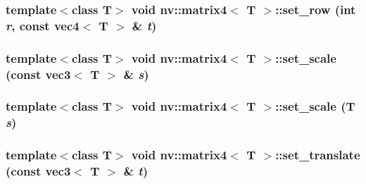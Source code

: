 \hypertarget{classnv_1_1matrix4_d79dcdcafcf5fab54a990621f87c2f20}{
\subsubsection[{set\_\-row}]{\setlength{\rightskip}{0pt plus 5cm}template$<$class T$>$ void {\bf nv::matrix4}$<$ T $>$::set\_\-row (int {\em r}, \/  const {\bf vec4}$<$ T $>$ \& {\em t})}}
\label{classnv_1_1matrix4_d79dcdcafcf5fab54a990621f87c2f20}


\hypertarget{classnv_1_1matrix4_7663538941eda617052f477ec9eb2f15}{
\subsubsection[{set\_\-scale}]{\setlength{\rightskip}{0pt plus 5cm}template$<$class T$>$ void {\bf nv::matrix4}$<$ T $>$::set\_\-scale (const {\bf vec3}$<$ T $>$ \& {\em s})}}
\label{classnv_1_1matrix4_7663538941eda617052f477ec9eb2f15}


\hypertarget{classnv_1_1matrix4_6eec45000c6cdf881a50ecd09a6d803b}{
\subsubsection[{set\_\-scale}]{\setlength{\rightskip}{0pt plus 5cm}template$<$class T$>$ void {\bf nv::matrix4}$<$ T $>$::set\_\-scale (T {\em s})}}
\label{classnv_1_1matrix4_6eec45000c6cdf881a50ecd09a6d803b}


\hypertarget{classnv_1_1matrix4_03752260bd2264a4bcdfaa9b019f8777}{
\subsubsection[{set\_\-translate}]{\setlength{\rightskip}{0pt plus 5cm}template$<$class T$>$ void {\bf nv::matrix4}$<$ T $>$::set\_\-translate (const {\bf vec3}$<$ T $>$ \& {\em t})}}
\label{classnv_1_1matrix4_03752260bd2264a4bcdfaa9b019f8777}


